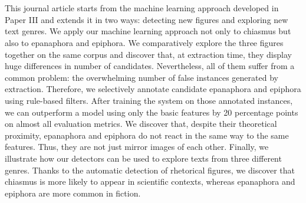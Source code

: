 \section*{}
This journal article starts from the machine learning approach developed in Paper III and extends it in two ways:
detecting new figures and exploring new text genres. We apply our machine learning approach not only to chiasmus but also to epanaphora and epiphora. We comparatively explore the three figures together on the same corpus and discover that, at extraction time, they display huge differences in number of candidates. Nevertheless, all of them suffer from a common problem: the overwhelming number of false instances generated by extraction. Therefore, we selectively annotate candidate epanaphora and epiphora using rule-based filters. After training the system on those annotated instances, we can outperform a model using only the basic features by 20 percentage points on almost all evaluation metrics. We discover that, despite their theoretical proximity, epanaphora and epiphora do not react in the same way to the same features. Thus, they are not just mirror images of each other. Finally, we illustrate how our detectors can be used to explore texts from three different genres. Thanks to the
automatic detection of rhetorical figures, we discover that chiasmus is more likely to appear in
scientific contexts, whereas epanaphora and epiphora are more common in fiction.
